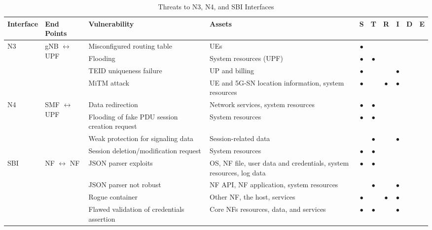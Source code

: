 \documentclass{report}
\begin{document}
\begin{table}[H]
    \centering
    \caption{Threats to N3, N4, and SBI Interfaces \cite{mahyoub2024security}}
    \renewcommand{\arraystretch}{1.2} 
    \setlength{\tabcolsep}{5pt} 
    \begin{tabularx}{\textwidth}{|l|l|X|X|c|c|c|c|c|c|}
    \hline
    \textbf{Interface} & \textbf{End Points} & \textbf{Vulnerability} & \textbf{Assets} & \textbf{S} & \textbf{T} & \textbf{R} & \textbf{I} & \textbf{D} & \textbf{E} \\ 
    \hline
    \multirow{4}{*}{N3} 
        & \multirow{4}{*}{gNB $\leftrightarrow$ UPF} 
        & Misconfigured routing table & UEs & $\bullet$ &  &  &  &  &  \\ \cline{3-10}
        & & Flooding & System resources (UPF) & $\bullet$ & $\bullet$ &  &  &  &  \\ \cline{3-10}
        & & TEID uniqueness failure & UP and billing & $\bullet$ &  &  & $\bullet$ &  &  \\ \cline{3-10}
        & & MiTM attack & UE and 5G-SN location information, system resources & $\bullet$ &  & $\bullet$ & $\bullet$ &  &  \\ \hline
    
    \multirow{4}{*}{N4} 
        & \multirow{4}{*}{SMF $\leftrightarrow$ UPF} 
        & Data redirection & Network services, system resources & $\bullet$ & $\bullet$ &  &  &  &  \\ \cline{3-10}
        & & Flooding of fake PDU session creation request & System resources & $\bullet$ & $\bullet$ &  &  &  &  \\ \cline{3-10}
        & & Weak protection for signaling data & Session-related data &  & $\bullet$ &  & $\bullet$ &  &  \\ \cline{3-10}
        & & Session deletion/modification request & System resources & $\bullet$ & $\bullet$ &  &  &  &  \\ \hline
    
    \multirow{4}{*}{SBI} 
        & \multirow{4}{*}{NF $\leftrightarrow$ NF} 
        & JSON parser exploits & OS, NF file, user data and credentials, system resources, log data & $\bullet$ & $\bullet$ &  &  &  &  \\ \cline{3-10}
        & & JSON parser not robust & NF API, NF application, system resources &  & $\bullet$ &  & $\bullet$ &  &  \\ \cline{3-10}
        & & Rogue container & Other NF, the host, services & $\bullet$ &  & $\bullet$ & $\bullet$ &  &  \\ \cline{3-10}
        & & Flawed validation of credentials assertion & Core NFs resources, data, and services & $\bullet$ & $\bullet$ &  & $\bullet$ &  &  \\ \hline
    
    \end{tabularx}
\end{table}
    
\end{document}
